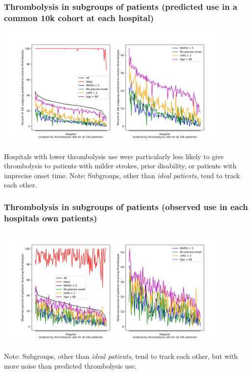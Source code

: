 \documentclass{beamer}
\begin{document}
\begin{frame}
\frametitle{Thrombolysis in subgroups of patients (predicted use in a common 10k cohort at each hospital)}

    \begin{center}
    \includegraphics[width=0.90\textwidth]{./images/15_10k_subgroup.jpg}
    \end{center}

\footnotesize Hospitals with lower thrombolysis use were particularly less likely to give thrombolysis to patients with milder strokes, prior disability, or patients with imprecise onset time.
\newline
\newline
\footnotesize Note: Subgroups, other than \emph{ideal patients}, tend to track each other.  

\end{frame}



\begin{frame}
\frametitle{Thrombolysis in subgroups of patients (observed use in each hospitals own patients)}

    \begin{center}
    \includegraphics[width=0.9\textwidth]{./images/15a_actual_subgroup.jpg}
    \end{center}

\footnotesize Note: Subgroups, other than \emph{ideal patients}, tend to track each other, but with more noise than predicted thrombolysis use. 

\end{frame}
\end{document}

